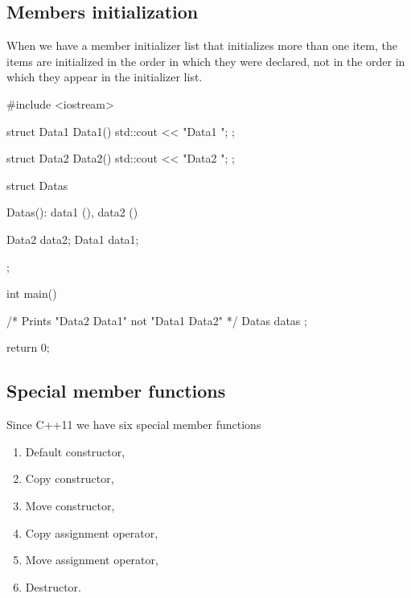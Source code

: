\documentclass[../main]{subfiles}
\begin{document}
\subsection{Members initialization}
    When we have a member initializer list that initializes more than one item, the items are initialized in the order in which they were declared, not in the order
in which they appear in the initializer list.
\begin{Code}
    #include <iostream>
    
    struct Data1
    {
        Data1() { std::cout << "Data1 "; }
    };
    
    struct Data2
    {
        Data2() { std::cout << "Data2 "; }
    };
    
    struct Datas
    {
        Datas(): data1 (), data2 ()
        {
        }
        
        Data2 data2;
        Data1 data1;
    };
    
    int main()
    {
        /* Prints "Data2 Data1" not "Data1 Data2" */
        Datas datas {};
        
        return 0;
    }
\end{Code}

\subsection{Special member functions}
    Since C++11 we have six special member functions
\begin{enumerate}
    \item Default constructor,
    \item Copy constructor,
    \item Move constructor,
    \item Copy assignment operator,
    \item Move assignment operator,
    \item Destructor.
\end{enumerate}
\end{document}
